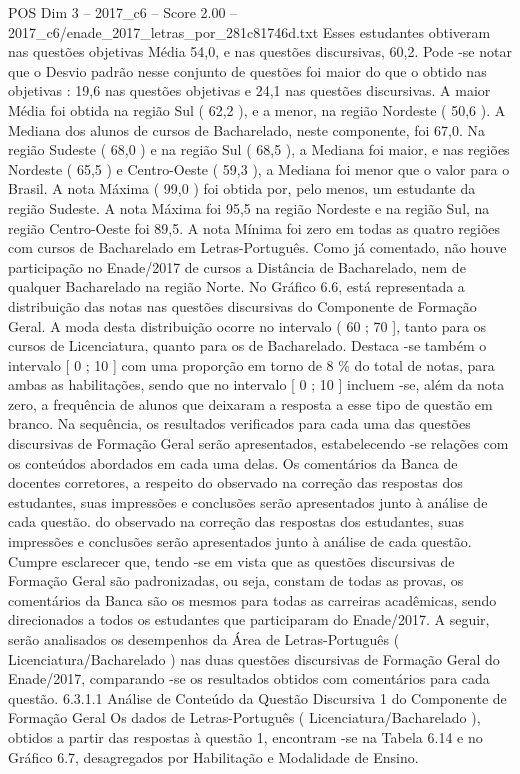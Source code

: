 \begin{textsample}{POS Dim 3 – 2017\_c6 – Score 2.00 – 2017\_c6/enade\_2017\_letras\_por\_281c81746d.txt}
Esses estudantes obtiveram nas questões objetivas Média 54,0, e nas questões discursivas, 60,2.
Pode -se notar que o Desvio padrão nesse conjunto de questões foi maior do que o obtido nas objetivas : 19,6 nas questões objetivas e 24,1 nas questões discursivas.
A maior Média foi obtida na região Sul ( 62,2 ), e a menor, na região Nordeste ( 50,6 ).
A Mediana dos alunos de cursos de Bacharelado, neste componente, foi 67,0.
Na região Sudeste ( 68,0 ) e na região Sul ( 68,5 ), a Mediana foi maior, e nas regiões Nordeste ( 65,5 ) e Centro-Oeste ( 59,3 ), a Mediana foi menor que o valor para o Brasil.
A nota Máxima ( 99,0 ) foi obtida por, pelo menos, um estudante da região Sudeste.
A nota Máxima foi 95,5 na região Nordeste e na região Sul, na região Centro-Oeste foi 89,5.
A nota Mínima foi zero em todas as quatro regiões com cursos de Bacharelado em Letras-Português.
Como já comentado, não houve participação no Enade/2017 de cursos a Distância de Bacharelado, nem de qualquer Bacharelado na região Norte.
No Gráfico 6.6, está representada a distribuição das notas nas questões discursivas do Componente de Formação Geral.
A moda desta distribuição ocorre no intervalo ( 60 ; 70 ], tanto para os cursos de Licenciatura, quanto para os de Bacharelado.
Destaca -se também o intervalo [ 0 ; 10 ] com uma proporção em torno de 8 \% do total de notas, para ambas as habilitações, sendo que no intervalo [ 0 ; 10 ] incluem -se, além da nota zero, a frequência de alunos que deixaram a resposta a esse tipo de questão em branco.
Na sequência, os resultados verificados para cada uma das questões discursivas de Formação Geral serão apresentados, estabelecendo -se relações com os conteúdos abordados em cada uma delas.
Os comentários da Banca de docentes corretores, a respeito do observado na correção das respostas dos estudantes, suas impressões e conclusões serão apresentados junto à análise de cada questão. do observado na correção das respostas dos estudantes, suas impressões e conclusões serão apresentados junto à análise de cada questão.
Cumpre esclarecer que, tendo -se em vista que as questões discursivas de Formação Geral são padronizadas, ou seja, constam de todas as provas, os comentários da Banca são os mesmos para todas as carreiras acadêmicas, sendo direcionados a todos os estudantes que participaram do Enade/2017.
A seguir, serão analisados os desempenhos da Área de Letras-Português ( Licenciatura/Bacharelado ) nas duas questões discursivas de Formação Geral do Enade/2017, comparando -se os resultados obtidos com comentários para cada questão. 6.3.1.1 Análise de Conteúdo da Questão Discursiva 1 do Componente de Formação Geral Os dados de Letras-Português ( Licenciatura/Bacharelado ), obtidos a partir das respostas à questão 1, encontram -se na Tabela 6.14 e no Gráfico 6.7, desagregados por Habilitação e Modalidade de Ensino.

\end{textsample}
